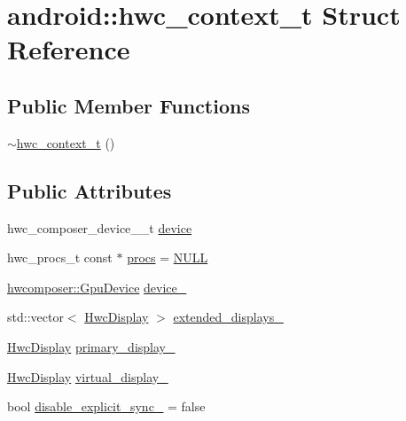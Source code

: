 \hypertarget{structandroid_1_1hwc__context__t}{}\section{android\+:\+:hwc\+\_\+context\+\_\+t Struct Reference}
\label{structandroid_1_1hwc__context__t}
\subsection*{Public Member Functions}
\begin{DoxyCompactItemize}
\item 
\mbox{\hyperlink{structandroid_1_1hwc__context__t_a0661dcf76ae2fbbf413231f92884b95e}{$\sim$hwc\+\_\+context\+\_\+t}} ()
\end{DoxyCompactItemize}
\subsection*{Public Attributes}
\begin{DoxyCompactItemize}
\item 
hwc\+\_\+composer\+\_\+device\+\_\+\_\+t \mbox{\hyperlink{structandroid_1_1hwc__context__t_aa6c71037a0f08ff676446e7550d6dc6e}{device}}
\item 
hwc\+\_\+procs\+\_\+t const  $\ast$ \mbox{\hyperlink{structandroid_1_1hwc__context__t_a6c22dd3733a9036176987ae60f925c72}{procs}} = \mbox{\hyperlink{alios_2platformdefines_8h_a070d2ce7b6bb7e5c05602aa8c308d0c4}{N\+U\+LL}}
\item 
\mbox{\hyperlink{classhwcomposer_1_1GpuDevice}{hwcomposer\+::\+Gpu\+Device}} \mbox{\hyperlink{structandroid_1_1hwc__context__t_ad4c60120c8e34bd4a95ce5db53ab0cee}{device\+\_\+}}
\item 
std\+::vector$<$ \mbox{\hyperlink{structandroid_1_1HwcDisplay}{Hwc\+Display}} $>$ \mbox{\hyperlink{structandroid_1_1hwc__context__t_adf667b3b03a5784c7efb2b552d8c4ddd}{extended\+\_\+displays\+\_\+}}
\item 
\mbox{\hyperlink{structandroid_1_1HwcDisplay}{Hwc\+Display}} \mbox{\hyperlink{structandroid_1_1hwc__context__t_ab4808690795b2de67cad626a470bf73f}{primary\+\_\+display\+\_\+}}
\item 
\mbox{\hyperlink{structandroid_1_1HwcDisplay}{Hwc\+Display}} \mbox{\hyperlink{structandroid_1_1hwc__context__t_aec682e5272f36dfe59e6a03c7242022a}{virtual\+\_\+display\+\_\+}}
\item 
bool \mbox{\hyperlink{structandroid_1_1hwc__context__t_af7908a5832baa08cb77cdd5032df1529}{disable\+\_\+explicit\+\_\+sync\+\_\+}} = false
\end{DoxyCompactItemize}


